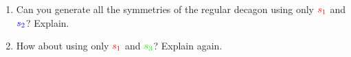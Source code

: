 \documentclass[a4paper,11pt]{article}
\newcommand{\clr}{\textcolor{red}}
\newcommand{\clb}{\textcolor{blue}}
\newcommand{\clg}{\textcolor{green}}
\begin{document}
\begin{enumerate}
\begin{center}
 \end{center}
 \begin{enumerate}
  \item Can you generate all the symmetries of the regular decagon using only
   $\clr{s_1}$ and $\clb{s_2}$? Explain.
  \item How about using only $\clr{s_1}$ and $\clg{s_3}$? Explain again.
 \end{enumerate}
\end{enumerate}
\end{document}
